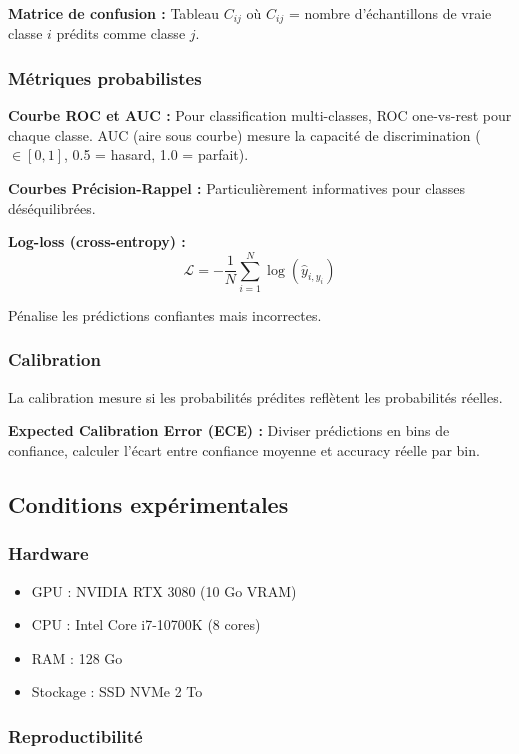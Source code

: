 \textbf{Matrice de confusion :}
Tableau $C_{ij}$ où $C_{ij}$ = nombre d'échantillons de vraie classe $i$ prédits comme classe $j$.

\subsubsection{Métriques probabilistes}

\textbf{Courbe ROC et AUC :}
Pour classification multi-classes, ROC one-vs-rest pour chaque classe. AUC (aire sous courbe) mesure la capacité de discrimination ($\in [0,1]$, 0.5 = hasard, 1.0 = parfait).

\textbf{Courbes Précision-Rappel :}
Particulièrement informatives pour classes déséquilibrées.

\textbf{Log-loss (cross-entropy) :}
\[
\mathcal{L} = -\frac{1}{N}\sum_{i=1}^N \log(\hat{y}_{i, y_i})
\]

Pénalise les prédictions confiantes mais incorrectes.

\subsubsection{Calibration}

La calibration mesure si les probabilités prédites reflètent les probabilités réelles.

\textbf{Expected Calibration Error (ECE) :}
Diviser prédictions en bins de confiance, calculer l'écart entre confiance moyenne et accuracy réelle par bin.

\subsection{Conditions expérimentales}

\subsubsection{Hardware}

\begin{itemize}
    \item GPU : NVIDIA RTX 3080 (10 Go VRAM)
    \item CPU : Intel Core i7-10700K (8 cores)
    \item RAM : 128 Go
    \item Stockage : SSD NVMe 2 To
\end{itemize}

\subsubsection{Reproductibilité}

